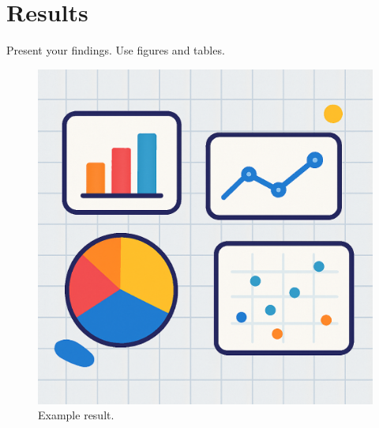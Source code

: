 \section{Results}
\label{sec:results}

Present your findings. Use figures and tables.

\begin{figure}[H]
  \centering
  \includegraphics[width=0.7\linewidth]{figures/example.png}
  \caption{Example result.}
  \label{fig:example}
\end{figure}
